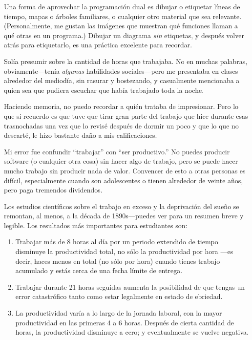 Una forma de aprovechar la programación dual es dibujar o etiquetar líneas de tiempo,
mapas o árboles familiares,
o cualquier otro material que sea relevante.
(Personalmente, me gustan las imágenes que muestran qué funciones llaman a qué otras en un programa.)
Dibujar un diagrama \emph{sin} etiquetas,
y después volver atrás para etiquetarlo,
es una práctica excelente para recordar.


Solía presumir sobre la cantidad de horas que trabajaba.
No en muchas palabras,
obviamente---tenía \emph{algunas} habilidades sociales---pero
me presentaba en clases alrededor del mediodía,
sin rasurar y bostezando,
y casualmente mencionaba a quien sea que pudiera escuchar
que había trabajado toda la noche.

Haciendo memoria,
no puedo recordar a quién trataba de impresionar.
Pero lo que sí recuerdo es
que tuve que tirar gran parte del trabajo que hice durante esas trasnochadas
una vez que lo revisé después de dormir un poco
y que lo que no descarté, le hizo bastante daño a mis calificaciones.

Mi error fue confundir ``trabajar'' con ``ser productivo.''
No puedes producir software (o cualquier otra cosa) sin hacer algo de trabajo,
pero se puede hacer mucho trabajo sin producir nada de valor.
Convencer de esto a otras personas es difícil,
especialmente cuando son adolescentes o tienen alrededor de veinte años,
pero paga tremendos dividendos.

Los estudios científicos sobre el trabajo en exceso y la deprivación del sueño se remontan, al menos, a la década de 1890s---puedes ver
\cite{Robi2005} para un resumen breve y legible.
Los resultados más importantes para estudiantes son:

\begin{enumerate}

\item
  Trabajar más de 8 horas al día por un periodo extendido de tiempo
  disminuye la productividad total,
  no sólo la productividad por hora ---es decir, haces menos en total (no sólo por hora)
  cuando tienes trabajo acumulado y estás cerca de una fecha límite de entrega.

\item
  Trabajar durante 21 horas seguidas aumenta la posibilidad de que tengas un error catastrófico
  tanto como estar legalmente en estado de ebriedad.

\item
  La productividad varía a lo largo de la jornada laboral,
  con la mayor productividad en las primeras 4 a 6 horas.
  Después de cierta cantidad de horas,
  la productividad disminuye a cero;
  y eventualmente se vuelve negativa.

\end{enumerate}

